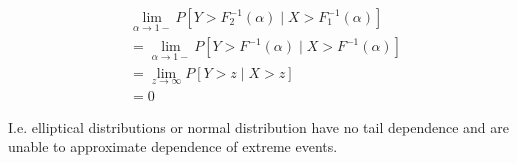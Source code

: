 \documentclass[a4paper,12pt]{article}
\begin{document}
\begin{align}
     & \lim_{\alpha \to 1-}  P[ Y > F_{2}^{-1} ( \alpha) \mid X > F_{1}^{-1} ( \alpha) ] \\
     & =\lim_{\alpha \to 1-}  P[ Y > F^{-1} ( \alpha) \mid X > F^{-1} ( \alpha) ]        \\
     & =\lim_{z \to \infty}  P[ Y > z  \mid X > z ]                                      \\
     & = 0
\end{align}

I.e. elliptical distributions or normal distribution have no tail dependence and are
unable to approximate dependence of extreme events.









\newpage
\printbibliography
\end{document}
